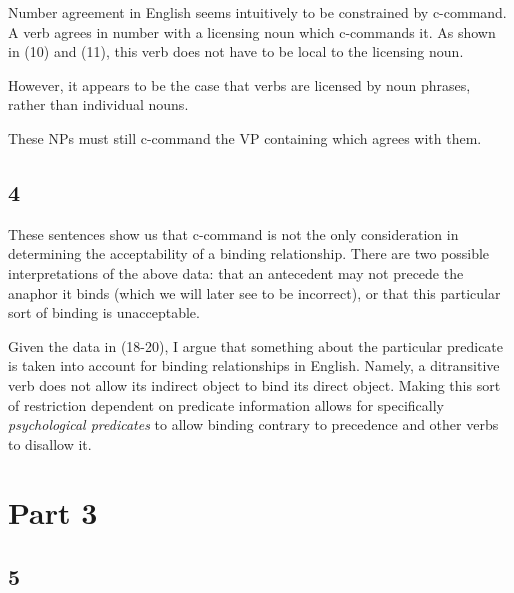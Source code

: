 \documentclass[doc,12pt]{apa6}
\begin{document}
Number agreement in English seems intuitively to be constrained by c-command. A
verb agrees in number with a licensing noun which c-commands it.  As shown in
(10) and (11), this verb does not have to be local to the licensing noun.
\begin{exe}
\end{exe}
However, it appears to be the case that verbs are licensed by noun phrases,
rather than individual nouns.
\begin{exe}
\end{exe}
These NPs must still c-command the VP containing which agrees with them.

\subsection{4}

\begin{exe}
\end{exe}

These sentences show us that c-command is not the only consideration in
determining the acceptability of a binding relationship. There are two possible
interpretations of the above data: that an antecedent may not precede the
anaphor it binds (which we will later see to be incorrect), or that this
particular sort of binding is unacceptable.

Given the data in (18-20), I argue that something about the particular
predicate is taken into account for binding relationships in English. Namely, a
ditransitive verb does not allow its indirect object to bind its direct object.
Making this sort of restriction dependent on predicate information allows for
specifically \emph{psychological predicates} to allow binding contrary to
precedence and other verbs to disallow it.

\section{Part 3}

\subsection{5}
\end{document}
